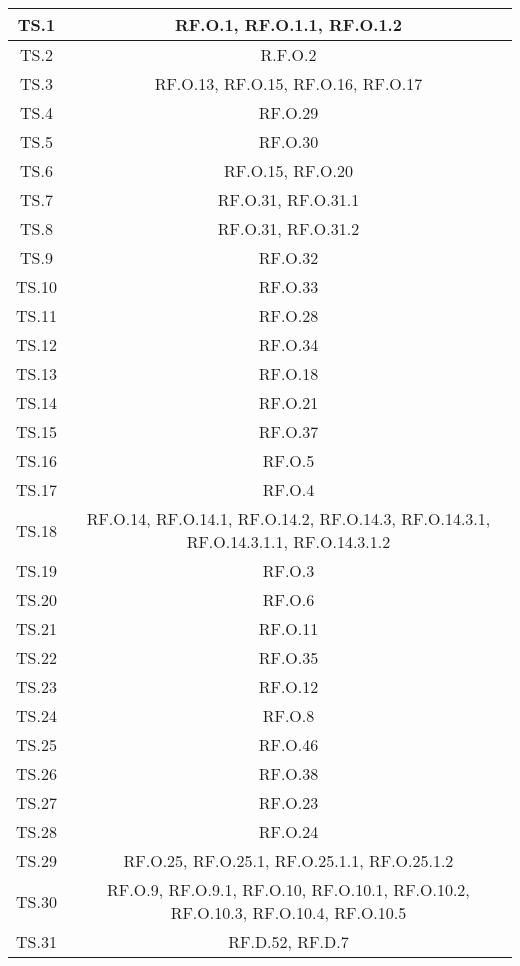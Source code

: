 \begin{adjustwidth}{-0.5cm}{-0.5cm}
\begin{longtable}{|c|c|}
    TS.1 & RF.O.1, RF.O.1.1, RF.O.1.2\\
		\hline TS.2 & R.F.O.2\\
		\hline TS.3 & RF.O.13, RF.O.15, RF.O.16, RF.O.17\\
		\hline TS.4 & RF.O.29\\
		\hline TS.5 & RF.O.30\\
		\hline TS.6 & RF.O.15, RF.O.20\\
		\hline TS.7 & RF.O.31, RF.O.31.1\\
		\hline TS.8 & RF.O.31, RF.O.31.2\\
		\hline TS.9 & RF.O.32\\
		\hline TS.10 & RF.O.33\\
		\hline TS.11 & RF.O.28\\
		\hline TS.12 & RF.O.34\\
		\hline TS.13 & RF.O.18\\
		\hline TS.14 & RF.O.21\\
		\hline TS.15 & RF.O.37\\
		\hline TS.16 & RF.O.5\\
		\hline TS.17 & RF.O.4\\
		\hline TS.18 & RF.O.14, RF.O.14.1, RF.O.14.2, RF.O.14.3, RF.O.14.3.1, RF.O.14.3.1.1, RF.O.14.3.1.2\\
		\hline TS.19 & RF.O.3\\
		\hline TS.20 & RF.O.6\\
		\hline TS.21 & RF.O.11\\
		\hline TS.22 & RF.O.35\\
		\hline TS.23 & RF.O.12\\
		\hline TS.24 & RF.O.8\\
		\hline TS.25 & RF.O.46\\
		\hline TS.26 & RF.O.38\\
		\hline TS.27 & RF.O.23\\
		\hline TS.28 & RF.O.24\\
		\hline TS.29 & RF.O.25, RF.O.25.1, RF.O.25.1.1, RF.O.25.1.2\\
		\hline TS.30 & RF.O.9, RF.O.9.1, RF.O.10, RF.O.10.1, RF.O.10.2, RF.O.10.3, RF.O.10.4, RF.O.10.5\\
		\hline TS.31 & RF.D.52, RF.D.7\\
  \end{longtable}
\end{adjustwidth}
\egroup